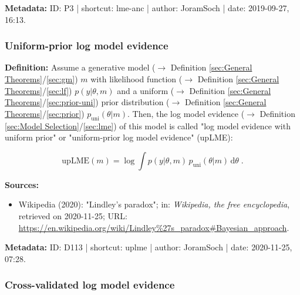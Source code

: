 \documentclass[a4paper,12pt,twoside]{book}
\begin{document}
\vspace{1em}
\textbf{Metadata:} ID: P3 | shortcut: lme-anc | author: JoramSoch | date: 2019-09-27, 16:13.
\vspace{1em}



\subsubsection[\textit{Uniform-prior log model evidence}]{Uniform-prior log model evidence} \label{sec:uplme}
\setcounter{equation}{0}

\textbf{Definition:} Assume a generative model ($\rightarrow$ Definition \ref{sec:General Theorems}/\ref{sec:gm}) $m$ with likelihood function ($\rightarrow$ Definition \ref{sec:General Theorems}/\ref{sec:lf}) $p(y \vert \theta, m)$ and a uniform ($\rightarrow$ Definition \ref{sec:General Theorems}/\ref{sec:prior-uni}) prior distribution ($\rightarrow$ Definition \ref{sec:General Theorems}/\ref{sec:prior}) $p_{\mathrm{uni}}(\theta \vert m)$. Then, the log model evidence ($\rightarrow$ Definition \ref{sec:Model Selection}/\ref{sec:lme}) of this model is called "log model evidence with uniform prior" or "uniform-prior log model evidence" (upLME):

\begin{equation} \label{eq:uplme-upLME}
\mathrm{upLME}(m) = \log \int p(y \vert \theta, m) \, p_{\mathrm{uni}}(\theta \vert m) \, \mathrm{d}\theta \; .
\end{equation}


\vspace{1em}
\textbf{Sources:}
\begin{itemize}
\item Wikipedia (2020): "Lindley's paradox"; in: \textit{Wikipedia, the free encyclopedia}, retrieved on 2020-11-25; URL: \url{https://en.wikipedia.org/wiki/Lindley%27s_paradox#Bayesian_approach}.
\end{itemize}


\vspace{1em}
\textbf{Metadata:} ID: D113 | shortcut: uplme | author: JoramSoch | date: 2020-11-25, 07:28.
\vspace{1em}



\subsubsection[\textit{Cross-validated log model evidence}]{Cross-validated log model evidence} \label{sec:cvlme}
\setcounter{equation}{0}
\end{document}
